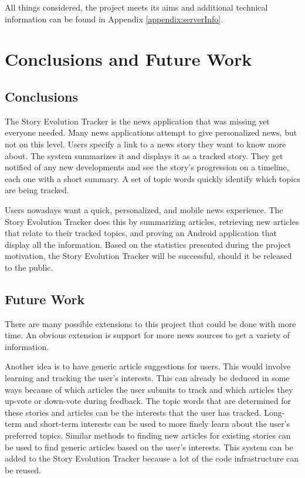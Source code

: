 \documentclass[11pt,titlepage]{report}
\begin{document}
All things considered, the project meets its aims and additional technical information can be found in Appendix \ref{appendix:serverInfo}.

\chapter{Conclusions and Future Work}
\section{Conclusions}
The Story Evolution Tracker is the news application that was missing yet everyone needed. Many news applications attempt to give personalized news, but not on this level. Users specify a link to a news story they want to know more about. The system summarizes it and displays it as a tracked story. They get notified of any new developments and see the story's progression on a timeline, each one with a short summary. A set of topic words quickly identify which topics are being tracked. 

Users nowadays want a quick, personalized, and mobile news experience. The Story Evolution Tracker does this by summarizing articles, retrieving new articles that relate to their tracked topics, and proving an Android application that display all the information. Based on the statistics presented during the project motivation, the Story Evolution Tracker will be successful, should it be released to the public.
 
\section{Future Work}
There are many possible extensions to this project that could be done with more time. An obvious extension is support for more news sources to get a variety of information. 

Another idea is to have generic article suggestions for users. This would involve learning and tracking the user's interests. This can already be deduced in some ways because of which articles the user submits to track and which articles they up-vote or down-vote during feedback. The topic words that are determined for these stories and articles can be the interests that the user has tracked. Long-term and short-term interests can be used to more finely learn about the user's preferred topics. Similar methods to finding new articles for existing stories can be used to find generic articles based on the user's interests. This system can be added to the Story Evolution Tracker because a lot of the code infrastructure can be reused.
\end{document}
